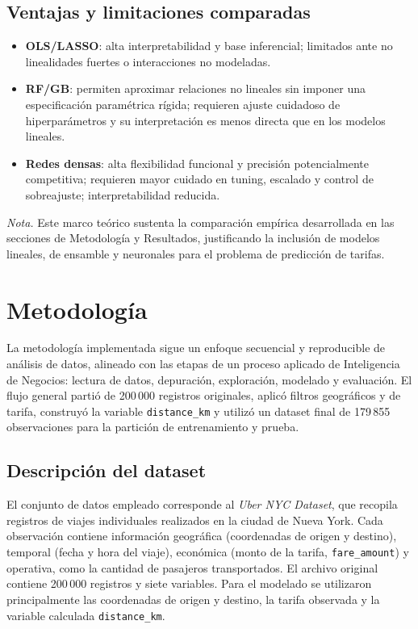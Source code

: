 \documentclass[10pt]{article}
\begin{document}
	\subsection{Ventajas y limitaciones comparadas}
	\begin{itemize}
		\item \textbf{OLS/LASSO}: alta interpretabilidad y base inferencial; limitados ante no linealidades fuertes o interacciones no modeladas.
		\item \textbf{RF/GB}: permiten aproximar relaciones no lineales sin imponer una especificación paramétrica rígida; requieren ajuste cuidadoso de hiperparámetros y su interpretación es menos directa que en los modelos lineales.
		\item \textbf{Redes densas}: alta flexibilidad funcional y precisión potencialmente competitiva; requieren mayor cuidado en tuning, escalado y control de sobreajuste; interpretabilidad reducida.
	\end{itemize}

	\vspace{0.5em}
	\noindent\textit{Nota.} Este marco teórico sustenta la comparación empírica desarrollada en las secciones de Metodología y Resultados, justificando la inclusión de modelos lineales, de ensamble y neuronales para el problema de predicción de tarifas.

	\section{Metodología}
	\label{sec:metodologia}

	La metodología implementada sigue un enfoque secuencial y reproducible de análisis de datos, alineado con las etapas de un proceso aplicado de Inteligencia de Negocios: lectura de datos, depuración, exploración, modelado y evaluación. El flujo general partió de 200\,000 registros originales, aplicó filtros geográficos y de tarifa, construyó la variable \texttt{distance\_km} y utilizó un dataset final de 179\,855 observaciones para la partición de entrenamiento y prueba.

	\subsection{Descripción del dataset}
	El conjunto de datos empleado corresponde al \textit{Uber NYC Dataset}, que recopila registros de viajes individuales realizados en la ciudad de Nueva York. Cada observación contiene información geográfica (coordenadas de origen y destino), temporal (fecha y hora del viaje), económica (monto de la tarifa, \texttt{fare\_amount}) y operativa, como la cantidad de pasajeros transportados.
	El archivo original contiene 200\,000 registros y siete variables. Para el modelado se utilizaron principalmente las coordenadas de origen y destino, la tarifa observada y la variable calculada \texttt{distance\_km}.
\end{document}
